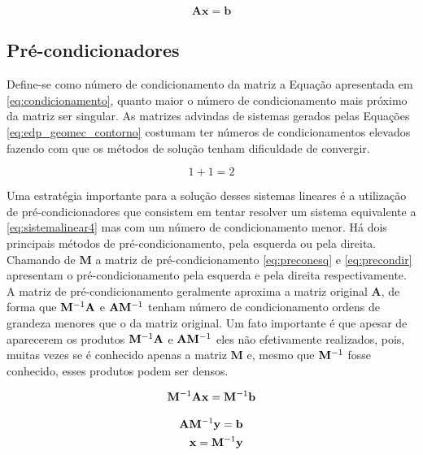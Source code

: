 \begin{equation} \label{eq:sistemalinear4}
    \mathbf{Ax = b}
\end{equation}

\subsection{Pré-condicionadores}

Define-se como número de condicionamento da matriz a Equação apresentada em \eqref{eq:condicionamento}, quanto maior o número de condicionamento mais próximo da matriz ser singular. As matrizes advindas de sistemas gerados pelas Equações \eqref{eq:edp_geomec_contorno} costumam ter números de condicionamentos elevados fazendo com que os métodos de solução tenham dificuldade de convergir.

\begin{equation} \label{eq:condicionamento}
1+1=2
\end{equation}


Uma estratégia importante para a solução desses sistemas lineares é a utilização de pré-condicionadores que consistem em tentar resolver um sistema equivalente a \eqref{eq:sistemalinear4} mas com um número de condicionamento menor. Há dois principais métodos de pré-condicionamento, pela esquerda ou pela direita. Chamando de $\mathbf{M}$ a matriz de pré-condicionamento  \eqref{eq:preconesq} e \eqref{eq:precondir} apresentam o pré-condicionamento pela esquerda e pela direita respectivamente. A matriz de pré-condicionamento geralmente aproxima a matriz original $\mathbf{A}$, de forma que $\mathbf{M}^{-1} \mathbf{A}$ e $\mathbf{A} \mathbf{M}^{-1}$ tenham número de condicionamento ordens de grandeza menores que o da matriz original. Um fato importante é que apesar de aparecerem os produtos $\mathbf{M}^{-1} \mathbf{A}$ e $\mathbf{A} \mathbf{M}^{-1}$ eles não efetivamente realizados, pois, muitas vezes se é conhecido apenas a matriz $\mathbf{M}$ e, mesmo que $\mathbf{M}^{-1}$ fosse conhecido, esses produtos podem ser densos.  


\begin{equation} \label{eq:preconesq}
\mathbf{M}^{-1} \mathbf{A} \mathbf{x}= \mathbf{M}^{-1} \mathbf{b}
\end{equation}

\begin{align} \label{eq:precondir}
\mathbf{A} \mathbf{M}^{-1} \mathbf{y} = \mathbf{b} \\
\mathbf{x} = \mathbf{M}^{-1} \mathbf{{y}}
\end{align}


